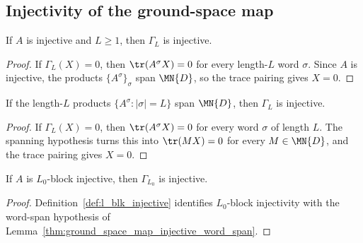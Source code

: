 \subsection{Injectivity of the ground-space map}

\begin{lemma}\label{thm:ground_space_map_injective}
    \leanok
    If $A$ is injective and $L \ge 1$, then $\Gamma_L$ is injective.
\end{lemma}

\begin{proof}
    \leanok
    If $\Gamma_L(X) = 0$, then $\tr(A^\sigma X) = 0$ for every length-$L$ word
    $\sigma$. Since $A$ is injective, the products $\{A^\sigma\}_\sigma$ span
    $\MN{D}$, so the trace pairing gives $X = 0$.
\end{proof}

\begin{lemma}
    \label{thm:ground_space_map_injective_word_span}
    \leanok
    If the length-$L$ products $\{A^\sigma : |\sigma| = L\}$ span $\MN{D}$, then
    $\Gamma_L$ is injective.
\end{lemma}

\begin{proof}
    \leanok
    If $\Gamma_L(X) = 0$, then $\tr(A^\sigma X) = 0$ for every word $\sigma$ of
    length $L$. The spanning hypothesis turns this into $\tr(MX) = 0$ for every
    $M \in \MN{D}$, and the trace pairing gives $X = 0$.
\end{proof}

\begin{lemma}
    \label{thm:ground_space_map_injective_blk}
    \leanok
    If $A$ is $L_0$-block injective, then $\Gamma_{L_0}$ is injective.
\end{lemma}

\begin{proof}
    \leanok
    Definition~\ref{def:l_blk_injective} identifies $L_0$-block injectivity with
    the word-span hypothesis of
    Lemma~\ref{thm:ground_space_map_injective_word_span}.
\end{proof}

